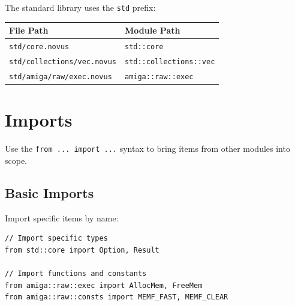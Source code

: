 The standard library uses the \texttt{std} prefix:

\begin{center}
\begin{tabular}{ll}
\textbf{File Path} & \textbf{Module Path} \\
\hline
\texttt{std/core.novus} & \texttt{std::core} \\
\texttt{std/collections/vec.novus} & \texttt{std::collections::vec} \\
\texttt{std/amiga/raw/exec.novus} & \texttt{amiga::raw::exec} \\
\end{tabular}
\end{center}

\section{Imports}
\label{sec:imports}

Use the \texttt{from ... import ...} syntax to bring items from other modules into scope.

\subsection{Basic Imports}
\label{subsec:basic-imports}

Import specific items by name:

\begin{lstlisting}
// Import specific types
from std::core import Option, Result

// Import functions and constants
from amiga::raw::exec import AllocMem, FreeMem
from amiga::raw::consts import MEMF_FAST, MEMF_CLEAR
\end{lstlisting}

